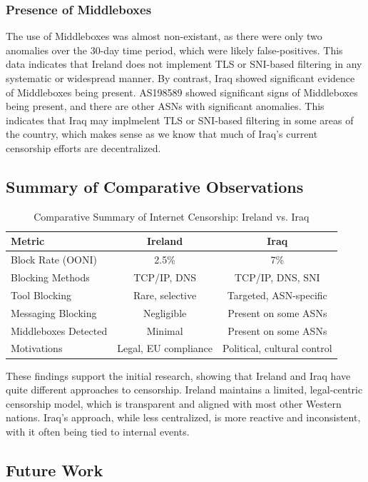 \subsubsection{Presence of Middleboxes}

The use of Middleboxes was almost non-existant, as there were only two anomalies over the 30-day time period, which were likely false-positives. This data indicates that Ireland does not implement TLS or SNI-based filtering in any systematic or widespread manner. By contrast, Iraq showed significant evidence of Middleboxes being present. AS198589 showed significant signs of Middleboxes being present, and there are other ASNs with significant anomalies. This indicates that Iraq may implmelent TLS or SNI-based filtering in some areas of the country, which makes sense as we know that much of Iraq's current censorship efforts are decentralized. 

\subsection{Summary of Comparative Observations}

\begin{table}[H]
\centering
\caption{Comparative Summary of Internet Censorship: Ireland vs. Iraq}
\begin{tabular}{lcc}
\toprule
\textbf{Metric} & \textbf{Ireland} & \textbf{Iraq} \\
\midrule
Block Rate (OONI) & 2.5\% & 7\% \\
Blocking Methods & TCP/IP, DNS & TCP/IP, DNS, SNI \\
Tool Blocking & Rare, selective & Targeted, ASN-specific \\
Messaging Blocking & Negligible & Present on some ASNs \\
Middleboxes Detected & Minimal & Present on some ASNs \\
Motivations & Legal, EU compliance & Political, cultural control \\
\bottomrule
\end{tabular}
\label{tab:comparison_summary}
\end{table}

These findings support the initial research, showing that Ireland and Iraq have quite different approaches to censorship. Ireland maintains a limited, legal-centric censorship model, which is transparent and aligned with most other Western nations. Iraq's approach, while less centralized, is more reactive and inconsistent, with it often being tied to internal events. 

\subsection{Future Work}

